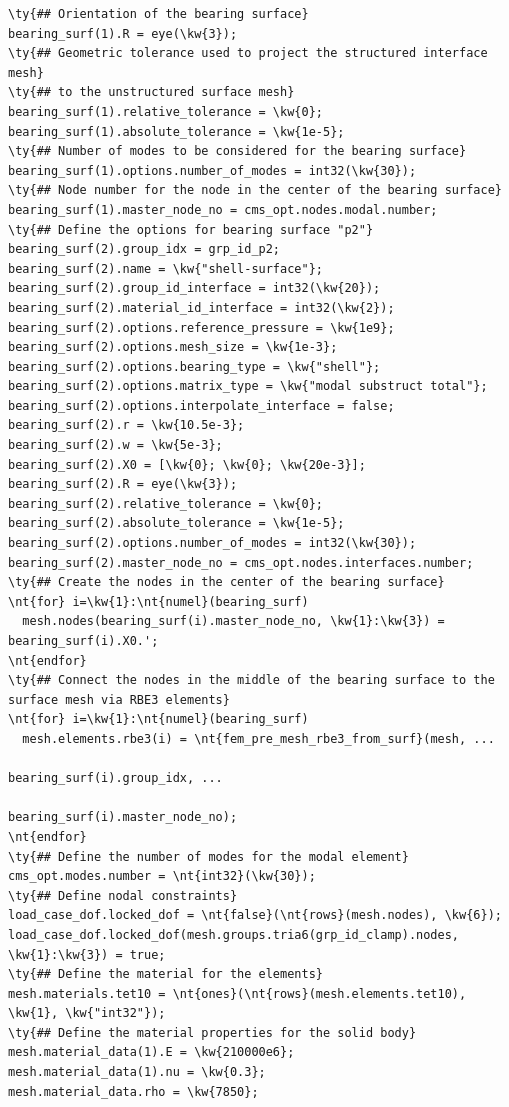 \begin{Verbatim}[commandchars=\\\{\}]
\ty{## Orientation of the bearing surface}
bearing_surf(1).R = eye(\kw{3});
\ty{## Geometric tolerance used to project the structured interface mesh}
\ty{## to the unstructured surface mesh}
bearing_surf(1).relative_tolerance = \kw{0};
bearing_surf(1).absolute_tolerance = \kw{1e-5};
\ty{## Number of modes to be considered for the bearing surface}
bearing_surf(1).options.number_of_modes = int32(\kw{30});
\ty{## Node number for the node in the center of the bearing surface}
bearing_surf(1).master_node_no = cms_opt.nodes.modal.number;
\ty{## Define the options for bearing surface "p2"}
bearing_surf(2).group_idx = grp_id_p2;
bearing_surf(2).name = \kw{"shell-surface"};
bearing_surf(2).group_id_interface = int32(\kw{20});
bearing_surf(2).material_id_interface = int32(\kw{2});
bearing_surf(2).options.reference_pressure = \kw{1e9};
bearing_surf(2).options.mesh_size = \kw{1e-3};
bearing_surf(2).options.bearing_type = \kw{"shell"};
bearing_surf(2).options.matrix_type = \kw{"modal substruct total"};
bearing_surf(2).options.interpolate_interface = false;
bearing_surf(2).r = \kw{10.5e-3};
bearing_surf(2).w = \kw{5e-3};
bearing_surf(2).X0 = [\kw{0}; \kw{0}; \kw{20e-3}];
bearing_surf(2).R = eye(\kw{3});
bearing_surf(2).relative_tolerance = \kw{0};
bearing_surf(2).absolute_tolerance = \kw{1e-5};
bearing_surf(2).options.number_of_modes = int32(\kw{30});
bearing_surf(2).master_node_no = cms_opt.nodes.interfaces.number;
\ty{## Create the nodes in the center of the bearing surface}
\nt{for} i=\kw{1}:\nt{numel}(bearing_surf)
  mesh.nodes(bearing_surf(i).master_node_no, \kw{1}:\kw{3}) = bearing_surf(i).X0.';
\nt{endfor}
\ty{## Connect the nodes in the middle of the bearing surface to the surface mesh via RBE3 elements}
\nt{for} i=\kw{1}:\nt{numel}(bearing_surf)
  mesh.elements.rbe3(i) = \nt{fem_pre_mesh_rbe3_from_surf}(mesh, ...
                                                      bearing_surf(i).group_idx, ...
                                                      bearing_surf(i).master_node_no);
\nt{endfor}
\ty{## Define the number of modes for the modal element}
cms_opt.modes.number = \nt{int32}(\kw{30});
\ty{## Define nodal constraints}
load_case_dof.locked_dof = \nt{false}(\nt{rows}(mesh.nodes), \kw{6});
load_case_dof.locked_dof(mesh.groups.tria6(grp_id_clamp).nodes, \kw{1}:\kw{3}) = true;
\ty{## Define the material for the elements}
mesh.materials.tet10 = \nt{ones}(\nt{rows}(mesh.elements.tet10), \kw{1}, \kw{"int32"});
\ty{## Define the material properties for the solid body}
mesh.material_data(1).E = \kw{210000e6};
mesh.material_data(1).nu = \kw{0.3};
mesh.material_data.rho = \kw{7850};

\end{Verbatim}
